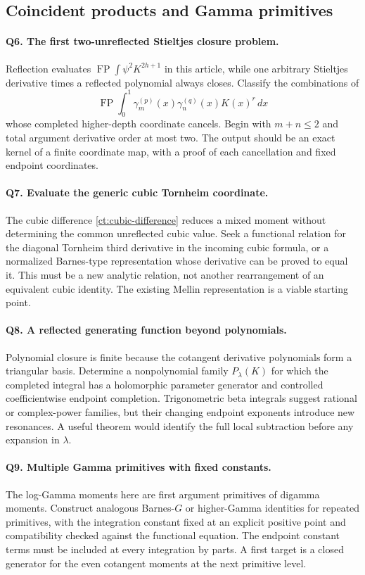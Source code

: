 \documentclass[11pt,a4paper]{article}
\numberwithin{equation}{section}
\theoremstyle{definition}
\theoremstyle{remark}
\newcommand{\FP}{\operatorname{FP}}
\begin{document}
\subsection{Coincident products and Gamma primitives}

\paragraph{Q6. The first two-unreflected Stieltjes closure problem.}
Reflection evaluates $\FP\int\psi^2K^{2h+1}$ in this article, while
one arbitrary Stieltjes derivative times a reflected polynomial always
closes. Classify the combinations of
\[
 \FP\int_0^1\gamma_m^{(p)}(x)\gamma_n^{(q)}(x)K(x)^r\,dx
\]
whose completed higher-depth coordinate cancels. Begin with
$m+n\le2$ and total argument derivative order at most two. The output
should be an exact kernel of a finite coordinate map, with a proof of
each cancellation and fixed endpoint coordinates.

\paragraph{Q7. Evaluate the generic cubic Tornheim coordinate.}
The cubic difference \eqref{ct:cubic-difference} reduces a mixed
moment without determining the common unreflected cubic value. Seek a
functional relation for the diagonal Tornheim third derivative in the
incoming cubic formula, or a normalized Barnes-type representation
whose derivative can be proved to equal it. This must be a new analytic
relation, not another rearrangement of an equivalent cubic identity.
The existing Mellin representation is a viable starting point.

\paragraph{Q8. A reflected generating function beyond polynomials.}
Polynomial closure is finite because the cotangent derivative
polynomials form a triangular basis. Determine a nonpolynomial family
$P_\lambda(K)$ for which the completed integral has a holomorphic
parameter generator and controlled coefficientwise endpoint completion.
Trigonometric beta integrals suggest rational or complex-power
families, but their changing endpoint exponents introduce new
resonances. A useful theorem would identify the full local subtraction
before any expansion in $\lambda$.

\paragraph{Q9. Multiple Gamma primitives with fixed constants.}
The log-Gamma moments here are first argument primitives of digamma
moments. Construct analogous Barnes-$G$ or higher-Gamma identities
for repeated primitives, with the integration constant fixed at an
explicit positive point and compatibility checked against the
functional equation. The endpoint constant terms must be included
at every integration by parts. A first target is a closed generator
for the even cotangent moments at the next primitive level.
\end{document}
